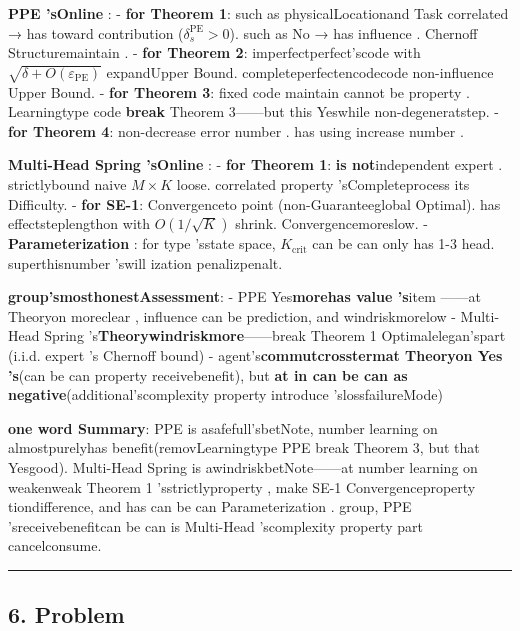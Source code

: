 \documentclass[
  12pt,
]{article}
\begin{document}
\textbf{PPE 'sOnline }:  - \textbf{for  Theorem 1}: such as physicalLocationand Task correlated  →
has toward contribution (\(\delta_s^{\text{PE}} > 0\)). such as No →
has influence . Chernoff Structuremaintain .  - \textbf{for  Theorem 2}: imperfectperfect'scode with 
\(\sqrt{\delta + O(\varepsilon_{\text{PE}})}\)
expandUpper Bound. completeperfectencodecode non-influence Upper Bound.  - \textbf{for  Theorem
3}: fixed code maintain cannot be property . Learningtype code \textbf{break }Theorem
3------but this Yes\textbf{}while non-degeneratstep.  - \textbf{for  Theorem
4}: non-decrease error number . has using increase number . 

\textbf{Multi-Head Spring 'sOnline }:  - \textbf{for  Theorem
1}: \textbf{is not}independent expert . strictlybound  naive \(M \times K\)
loose. correlated property 'sCompleteprocess its Difficulty.  - \textbf{for 
SE-1}: Convergenceto point (non-Guaranteeglobal Optimal). has effectsteplengthon with  \(O(1/\sqrt{K})\)
shrink. Convergencemoreslow.  -
\textbf{Parameterization }: for type 'sstate space, \(K_{\text{crit}}\) can be can only has 
1-3 head. superthisnumber 'swill ization penalizpenalt. 

\textbf{group'smosthonestAssessment}:  - PPE
Yes\textbf{morehas value 's}item ------at Theoryon moreclear , influence can be prediction, and windriskmorelow
- Multi-Head Spring 's\textbf{Theorywindriskmore}------break  Theorem 1
Optimalelegan'spart (i.i.d. expert 's Chernoff bound) -
agent's\textbf{commutcrosstermat Theoryon Yes 's}(can be can property receivebenefit), but \textbf{at in can be can as negative}(additional'scomplexity property introduce 'slossfailureMode)

\textbf{one word Summary}: PPE
is asafefull'sbetNote, number learning on almostpurelyhas benefit(removLearningtype  PPE break  Theorem
3, but that Yesgood). Multi-Head Spring
is awindriskbetNote------at number learning on weakenweak Theorem 1 'sstrictlyproperty , make  SE-1
Convergenceproperty tiondifference, and has can be can Parameterization . group, PPE 'sreceivebenefitcan be can is  Multi-Head
'scomplexity property part cancelconsume. 

\begin{center}\rule{0.5\linewidth}{0.5pt}\end{center}

\subsection{6. Problem}\label{ux5f00ux653eux95eeux9898}
\end{document}
